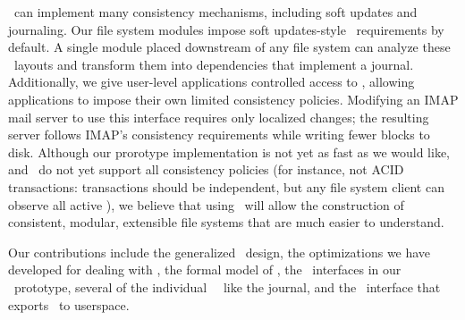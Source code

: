 \Chdescs\ can implement many consistency mechanisms, including
 soft updates and journaling.
%
Our file system modules impose soft updates-style \chdesc\
 requirements by default.
%
A single module placed downstream of any file system can analyze these
 \chdesc\ layouts and transform them into dependencies that
 implement a journal.
%
Additionally, we give user-level applications controlled access to \chdescs,
allowing applications to impose their own limited consistency
 policies.
%
Modifying an IMAP mail server to use this interface requires only localized
 changes; the resulting server follows IMAP's consistency
 requirements while writing fewer blocks to disk.
%
Although our prorotype implementation is not yet as fast as we would like,
 and \chdescs\ do not yet support all consistency policies (for instance,
 not ACID transactions: transactions should be independent, but any file
 system client can observe all active \chdescs), we believe that using
 \chdescs\ will allow the construction of consistent, modular, extensible
 file systems that are much easier to understand.


Our contributions include the generalized \chdesc\ design, the
 optimizations we have developed for dealing with \chdescs, the formal
 model of \chdescs, the \module\ interfaces in our \Kudos\ prototype,
 several of the individual \Kudos\ \modules\ like the journal, and the
 \opgroup\ interface that exports \chdescs\ to userspace.


